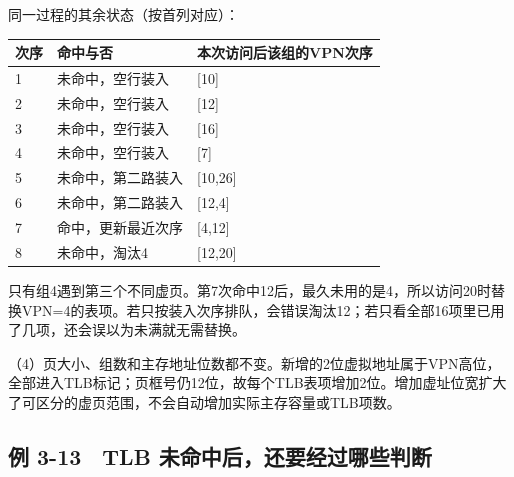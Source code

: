 同一过程的其余状态（按首列对应）：

\par\medskip\noindent\begin{minipage}{\linewidth}\fontsize{9.3}{12}\selectfont\begin{tabularx}{\linewidth}{@{}YYY@{}}
\toprule\noalign{}
次序 & 命中与否 & 本次访问后该组的VPN次序 \\
\midrule\noalign{}


1 & 未命中，空行装入 & {[}10{]} \\
2 & 未命中，空行装入 & {[}12{]} \\
3 & 未命中，空行装入 & {[}16{]} \\
4 & 未命中，空行装入 & {[}7{]} \\
5 & 未命中，第二路装入 & {[}10,26{]} \\
6 & 未命中，第二路装入 & {[}12,4{]} \\
7 & 命中，更新最近次序 & {[}4,12{]} \\
8 & 未命中，淘汰4 & {[}12,20{]} \\
\bottomrule\end{tabularx}
\end{minipage}\par\medskip

只有组4遇到第三个不同虚页。第7次命中12后，最久未用的是4，所以访问20时替换VPN=4的表项。若只按装入次序排队，会错误淘汰12；若只看全部16项里已用了几项，还会误以为未满就无需替换。

（4）页大小、组数和主存地址位数都不变。新增的2位虚拟地址属于VPN高位，全部进入TLB标记；页框号仍12位，故每个TLB表项增加2位。增加虚址位宽扩大了可区分的虚页范围，不会自动增加实际主存容量或TLB项数。

\subsection{例 3-13　TLB 未命中后，还要经过哪些判断}\label{CO03-31}


